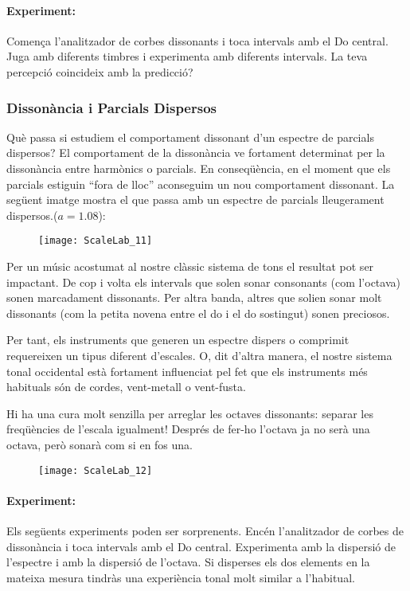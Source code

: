 \paragraph{Experiment:}
Comença l'analitzador de corbes dissonants i toca intervals amb el Do central. Juga amb diferents timbres i experimenta amb diferents intervals. La teva percepció coincideix amb la predicció?

\subsubsection{Dissonància i Parcials Dispersos}
Què passa si estudiem el comportament dissonant d'un espectre de parcials dispersos? El comportament de la dissonància ve fortament determinat per la dissonància entre harmònics o parcials. En conseqüència, en el moment que els parcials estiguin ``fora de lloc'' aconseguim un nou comportament dissonant.
La següent imatge mostra el que passa amb un espectre de parcials lleugerament dispersos.($a=1.08$):

\begin{figure}[h]
\centering
\texttt{[image: ScaleLab\_11]}
\end{figure}

Per un músic acostumat al nostre clàssic sistema de tons el resultat pot ser impactant. De cop i volta els intervals que solen sonar consonants (com l'octava) sonen marcadament dissonants. Per altra banda, altres que solien sonar molt dissonants (com la petita novena entre el do i el do sostingut) sonen preciosos.

Per tant, els instruments que generen un espectre dispers o comprimit requereixen un tipus diferent d'escales. O, dit d'altra manera, el nostre sistema tonal occidental està fortament influenciat pel fet que els instruments més habituals són de cordes, vent-metall o vent-fusta.

Hi ha una cura molt senzilla per arreglar les octaves dissonants: separar les freqüències de l'escala igualment! Després de fer-ho l'octava ja no serà una octava, però sonarà com si en fos una.

\begin{figure}[h]
\centering
\texttt{[image: ScaleLab\_12]}
\end{figure}

\paragraph{Experiment:}
Els següents experiments poden ser sorprenents. Encén l'analitzador de corbes de dissonància i toca intervals amb el Do central. Experimenta amb la dispersió de l'espectre i amb la dispersió de l'octava. Si disperses els dos elements en la mateixa mesura tindràs una experiència tonal molt similar a l'habitual.

